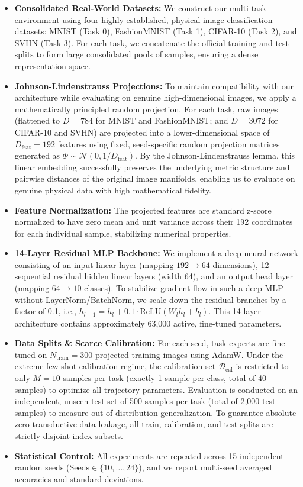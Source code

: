 \begin{itemize}
    \item \textbf{Consolidated Real-World Datasets:} We construct our multi-task environment using four highly established, physical image classification datasets: MNIST (Task 0), FashionMNIST (Task 1), CIFAR-10 (Task 2), and SVHN (Task 3). For each task, we concatenate the official training and test splits to form large consolidated pools of samples, ensuring a dense representation space.
    \item \textbf{Johnson-Lindenstrauss Projections:} To maintain compatibility with our architecture while evaluating on genuine high-dimensional images, we apply a mathematically principled random projection. For each task, raw images (flattened to $D=784$ for MNIST and FashionMNIST; and $D=3072$ for CIFAR-10 and SVHN) are projected into a lower-dimensional space of $D_{\text{feat}} = 192$ features using fixed, seed-specific random projection matrices generated as $\Phi \sim \mathcal{N}(0, 1/D_{\text{feat}})$. By the Johnson-Lindenstrauss lemma, this linear embedding successfully preserves the underlying metric structure and pairwise distances of the original image manifolds, enabling us to evaluate on genuine physical data with high mathematical fidelity.
    \item \textbf{Feature Normalization:} The projected features are standard z-score normalized to have zero mean and unit variance across their 192 coordinates for each individual sample, stabilizing numerical properties.
    \item \textbf{14-Layer Residual MLP Backbone:} We implement a deep neural network consisting of an input linear layer (mapping $192 \to 64$ dimensions), 12 sequential residual hidden linear layers (width 64), and an output head layer (mapping $64 \to 10$ classes). To stabilize gradient flow in such a deep MLP without LayerNorm/BatchNorm, we scale down the residual branches by a factor of 0.1, i.e., $h_{l+1} = h_l + 0.1 \cdot \text{ReLU}(W_l h_l + b_l)$. This 14-layer architecture contains approximately 63,000 active, fine-tuned parameters.
    \item \textbf{Data Splits \& Scarce Calibration:} For each seed, task experts are fine-tuned on $N_{\text{train}} = 300$ projected training images using AdamW. Under the extreme few-shot calibration regime, the calibration set $\mathcal{D}_{\text{cal}}$ is restricted to only $M = 10$ samples per task (exactly 1 sample per class, total of 40 samples) to optimize all trajectory parameters. Evaluation is conducted on an independent, unseen test set of 500 samples per task (total of 2,000 test samples) to measure out-of-distribution generalization. To guarantee absolute zero transductive data leakage, all train, calibration, and test splits are strictly disjoint index subsets.
    \item \textbf{Statistical Control:} All experiments are repeated across 15 independent random seeds ($\text{Seeds} \in \{10, \dots, 24\}$), and we report multi-seed averaged accuracies and standard deviations.
\end{itemize}

